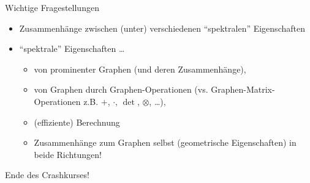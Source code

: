 \documentclass[aspectratio=169]{beamer}
\begin{document}
\begin{frame}{Wichtige Fragestellungen}

    \begin{block}{}

        \begin{itemize}

            \item Zusammenhänge zwischen (unter) verschiedenen \enquote{spektralen} Eigenschaften

            \item \enquote{spektrale} Eigenschaften \dots

            \begin{itemize}
                \item von prominenter Graphen (und deren Zusammenhänge),
                \item von Graphen durch Graphen-Operationen (vs. Graphen-Matrix-Operationen z.B. $+$, $\cdot$, $\det$, $\otimes$, \dots),
                \item (effiziente) Berechnung
                \item Zusammenhänge zum Graphen selbst (geometrische Eigenschaften) in beide Richtungen!
            \end{itemize}

        \end{itemize}

    \end{block}

\end{frame}

\begin{frame}{}

    \begin{block}{}

        {
            \centering
            \huge
            Ende des Crashkurses!
        }

    \end{block}

\end{frame}

\appendix
\end{document}
